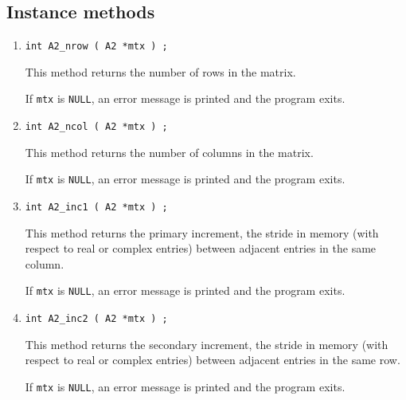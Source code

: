 \subsection{Instance methods}
\label{subsection:A2:proto:instance}
\par
\begin{enumerate}
\item
\begin{verbatim}
int A2_nrow ( A2 *mtx ) ;
\end{verbatim}
This method returns the number of rows in the matrix.
\par {}
If {\tt mtx} is {\tt NULL}, 
an error message is printed and the program exits.
\item
\begin{verbatim}
int A2_ncol ( A2 *mtx ) ;
\end{verbatim}
This method returns the number of columns in the matrix.
\par {}
If {\tt mtx} is {\tt NULL}, 
an error message is printed and the program exits.
\item
\begin{verbatim}
int A2_inc1 ( A2 *mtx ) ;
\end{verbatim}
This method returns the primary increment, the stride in memory
(with respect to real or complex entries)
between adjacent entries in the same column.
\par {}
If {\tt mtx} is {\tt NULL}, 
an error message is printed and the program exits.
\item
\begin{verbatim}
int A2_inc2 ( A2 *mtx ) ;
\end{verbatim}
This method returns the secondary increment, the stride in memory
(with respect to real or complex entries)
between adjacent entries in the same row.
\par {}
If {\tt mtx} is {\tt NULL}, 
an error message is printed and the program exits.

\end{enumerate}
